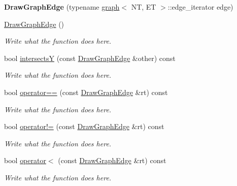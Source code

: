 \begin{DoxyCompactItemize}
\item 
\hypertarget{structGraphingInternals_1_1DrawGraphEdge_a611001de48b0a250e98640f21259ef5d}{{\bfseries Draw\+Graph\+Edge} (typename \hyperlink{classgraph}{graph}$<$ N\+T, E\+T $>$\+::edge\+\_\+iterator edge)}\label{structGraphingInternals_1_1DrawGraphEdge_a611001de48b0a250e98640f21259ef5d}

\item 
\hyperlink{structGraphingInternals_1_1DrawGraphEdge_a1fa4db89ea4cea36e20cea93f52ed899}{Draw\+Graph\+Edge} ()
\begin{DoxyCompactList}\small\item\em Write what the function does here. \end{DoxyCompactList}\item 
bool \hyperlink{structGraphingInternals_1_1DrawGraphEdge_ac23c07c80ebe47d6c3f35d230debdf27}{intersects\+Y} (const \hyperlink{structGraphingInternals_1_1DrawGraphEdge}{Draw\+Graph\+Edge} \&other) const 
\begin{DoxyCompactList}\small\item\em Write what the function does here. \end{DoxyCompactList}\item 
bool \hyperlink{structGraphingInternals_1_1DrawGraphEdge_aa94e7366ffcacafa180303f626af2f1c}{operator==} (const \hyperlink{structGraphingInternals_1_1DrawGraphEdge}{Draw\+Graph\+Edge} \&rt) const 
\begin{DoxyCompactList}\small\item\em Write what the function does here. \end{DoxyCompactList}\item 
bool \hyperlink{structGraphingInternals_1_1DrawGraphEdge_a2d7f280a0c085e4d2bd45f7210647c73}{operator!=} (const \hyperlink{structGraphingInternals_1_1DrawGraphEdge}{Draw\+Graph\+Edge} \&rt) const 
\begin{DoxyCompactList}\small\item\em Write what the function does here. \end{DoxyCompactList}\item 
bool \hyperlink{structGraphingInternals_1_1DrawGraphEdge_a3e244dfc1d1404cb8507592a97c77f5b}{operator$<$} (const \hyperlink{structGraphingInternals_1_1DrawGraphEdge}{Draw\+Graph\+Edge} \&rt) const 
\begin{DoxyCompactList}\small\item\em Write what the function does here. \end{DoxyCompactList}\item 

\end{DoxyCompactItemize}
